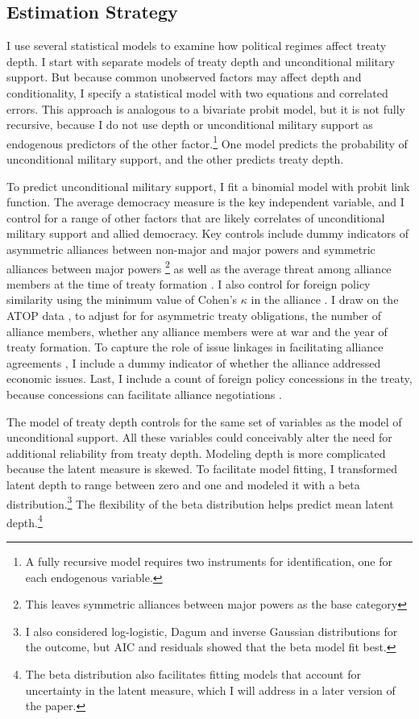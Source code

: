 \documentclass[12pt]{article}
\begin{document}
\subsection{Estimation Strategy}

I use several statistical models to examine how political regimes affect treaty depth. 
I start with separate models of treaty depth and unconditional military support. 
But because common unobserved factors may affect depth and conditionality, I specify a statistical model with two equations and correlated errors.
This approach is analogous to a bivariate probit model, but it is not fully recursive, because I do not use depth or unconditional military support as endogenous predictors of the other factor.\footnote{A fully recursive model requires two instruments for identification, one for each endogenous variable.}  
One model predicts the probability of unconditional military support, and the other predicts treaty depth.


To predict unconditional military support, I fit a binomial model with probit link function. 
The average democracy measure is the key independent variable, and I control for a range of other factors that are likely correlates of unconditional military support and allied democracy. 
Key controls include dummy indicators of asymmetric alliances between non-major and major powers and symmetric alliances between major powers \citep{Mattes2012}\footnote{This leaves symmetric alliances between major powers as the base category} as well as the average threat among alliance members at the time of treaty formation \citep{LeedsSavun2007}. 
I also control for foreign policy similarity \citep{Benson2012} using the minimum value of Cohen's $\kappa$ in the alliance \citep{Hage2011}.
I draw on the ATOP data \citep{Leedsetal2002}, to adjust for for asymmetric treaty obligations, the number of alliance members, whether any alliance members were at war and the year of treaty formation. 
To capture the role of issue linkages in facilitating alliance agreements \citep{Poast2012, Poast2013}, I include a dummy indicator of whether the alliance addressed economic issues.  
Last, I include a count of foreign policy concessions in the treaty, because concessions can facilitate alliance negotiations \citep{Johnson2015}. 


The model of treaty depth controls for the same set of variables as the model of unconditional support. 
All these variables could conceivably alter the need for additional reliability from treaty depth. 
Modeling depth is more complicated because the latent measure is skewed.
To facilitate model fitting, I transformed latent depth to range between zero and one and modeled it with a beta distribution.\footnote{I also considered log-logistic, Dagum and inverse Gaussian distributions for the outcome, but AIC and residuals showed that the beta model fit best.}
The flexibility of the beta distribution helps predict mean latent depth.\footnote{The beta distribution also facilitates fitting models that account for uncertainty in the latent measure, which I will address in a later version of the paper.} 
\end{document}
